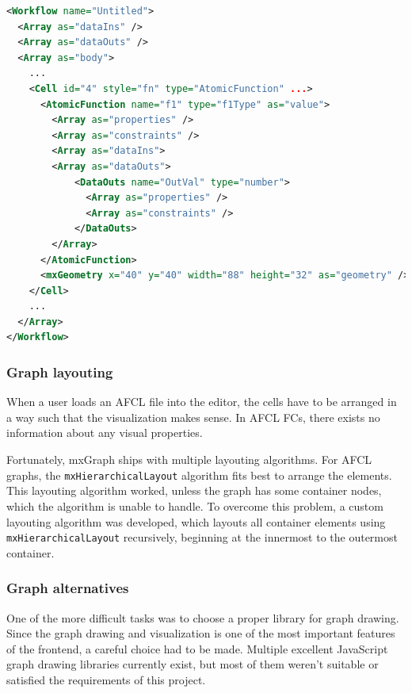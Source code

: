 \documentclass[a4paper,top=25mm,bottom=25mm,12pt,pdftex,halfparskip,twoside,openany,bibtotoc,numbers=noenddot]{scrbook}
\begin{document}
\begin{lstlisting}[language=XML,caption={Example of a XML-encoded AFCL FC.},label={lst:xml-workflow-example}]
<Workflow name="Untitled">
  <Array as="dataIns" />
  <Array as="dataOuts" />
  <Array as="body">
    ...
    <Cell id="4" style="fn" type="AtomicFunction" ...>
      <AtomicFunction name="f1" type="f1Type" as="value">
        <Array as="properties" />
        <Array as="constraints" />
        <Array as="dataIns">
        <Array as="dataOuts">
            <DataOuts name="OutVal" type="number">
              <Array as="properties" />
              <Array as="constraints" />
            </DataOuts>
        </Array>
      </AtomicFunction>
      <mxGeometry x="40" y="40" width="88" height="32" as="geometry" />
    </Cell>
    ...
  </Array>
</Workflow>
\end{lstlisting}


\subsubsection{Graph layouting}

When a user loads an AFCL file into the editor, the cells have to be arranged in a way such that the visualization makes sense. In AFCL FCs, there exists no information about any visual properties. 

Fortunately, mxGraph ships with multiple layouting algorithms.
For AFCL graphs, the \texttt{mxHierarchicalLayout} algorithm fits best to arrange the elements. This layouting algorithm worked, unless the graph has some container nodes, which the algorithm is unable to handle.
To overcome this problem, a custom layouting algorithm was developed, which layouts all container elements using \texttt{mxHierarchicalLayout} recursively, beginning at the innermost to the outermost container.

\label{sec:graph-alternatives}
\subsubsection{Graph alternatives}

One of the more difficult tasks was to choose a proper library for graph drawing. Since the graph drawing and visualization is one of the most important features of the frontend, a careful choice had to be made. Multiple excellent JavaScript graph drawing libraries currently exist, but most of them weren't suitable or satisfied the requirements of this project.
\end{document}
